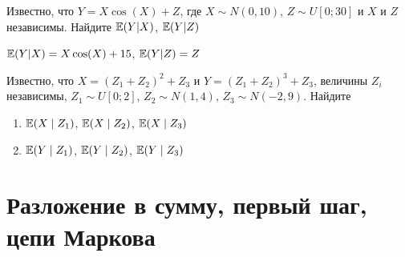 \begin{problem}
Известно, что $Y=X\cos(X)+Z$, где $X\sim N(0,10)$, $Z\sim U[0;30]$ и $X$ и $Z$ независимы. Найдите $\mathbb{E}(Y|X)$, $\mathbb{E}(Y|Z)$
\end{problem} 
\begin{solution} 
$\mathbb{E}(Y|X)=X\cos(X)+15$, $\mathbb{E}(Y|Z)=Z$
\end{solution}

\begin{problem}
Известно, что $X=(Z_1+Z_2)^2+Z_3$ и $Y=(Z_1+Z_2)^3+Z_3$, величины $Z_i$ независимы, $Z_1\sim U[0;2]$, $Z_2\sim N(1,4)$, $Z_3\sim N(-2,9)$. Найдите 
\begin{enumerate}
\item $\mathbb{E}(X \mid Z_1)$, $\mathbb{E}(X \mid Z_2)$, $\mathbb{E}(X \mid Z_3)$
\item $\mathbb{E}(Y \mid Z_1)$, $\mathbb{E}(Y \mid Z_2)$, $\mathbb{E}(Y \mid Z_3)$
\end{enumerate}

\end{problem} 
\begin{solution} 
\end{solution}


\section{Разложение в сумму, первый шаг, цепи Маркова}




